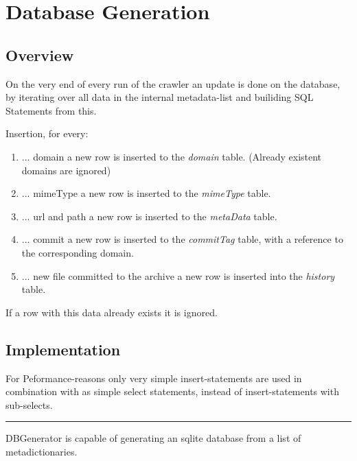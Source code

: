 \documentclass[letterpaper,10pt,english]{sphinxmanual}
\begin{document}
\chapter{Database Generation}
\label{dbgen:database-generation}\label{dbgen::doc}

\section{Overview}
\label{dbgen:overview}
On the very end of every run of the crawler an update is done on the database, by
iterating over all data in the internal metadata-list and builiding SQL Statements from this.

Insertion, for every:
\begin{enumerate}
\item {} 
... domain a new row is inserted to the \emph{domain} table. (Already existent domains are ignored)

\item {} 
... mimeType a new row is inserted to the \emph{mimeType} table.

\item {} 
... url and path a new row is inserted to the \emph{metaData} table.

\item {} 
... commit a new row is inserted to the \emph{commitTag} table, with a reference to the corresponding domain.

\item {} 
... new file committed to the archive a new row is inserted into the \emph{history} table.

\end{enumerate}

If a row with this data already exists it is ignored.


\section{Implementation}
\label{dbgen:implementation}
For Peformance-reasons only very simple insert-statements are used in combination
with as simple select statements, instead of insert-statements with sub-selects.


\bigskip\hrule{}\bigskip

\label{dbgen:module-crawler.dbgen}
DBGenerator is capable of generating an sqlite database
from a list of metadictionaries.
\end{document}
